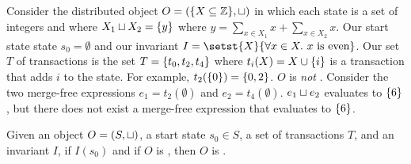 \begin{example}
  Consider the distributed object $O = (\{X \subseteq \mathbb{Z}\}, \sqcup)$ in
  which each state is a set of integers and where $X_1 \sqcup X_2 = \{y\}$
  where $y = \sum_{x \in X_1} x + \sum_{x \in X_2} x$. Our start state state
  $s_0 = \emptyset{}$ and our invariant $I = \setst{X}{\forall x \in X.\ x \
  \text{is even}}$. Our set $T$ of transactions is the set $T = \{t_0, t_2,
  t_4\}$ where $t_i(X) = X \cup \{i\}$ is a transaction that adds $i$ to the
  state. For example, $t_2(\{0\}) = \{0, 2\}$.
  $O$ is \emph{not} \sTImergereducible{}. Consider the two merge-free
  \sTIreachable{} expressions $e_1 = t_2(\emptyset)$ and $e_2 =
  t_4(\emptyset)$. $e_1 \sqcup e_2$ evaluates to $\{6\}$, but there does not
  exist a merge-free expression that evaluates to $\{6\}$.
\end{example}

{}

\begin{theorem}
  Given an object $O = (S, \sqcup)$, a start state $s_0 \in S$, a set of
  transactions $T$, and an invariant $I$, if $I(s_0)$ and if $O$ is
  \sTImergereducible{}, then $O$ is \sTIconfluent{}.
\end{theorem}

